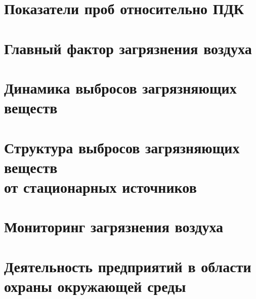 



\section{Показатели проб относительно ПДК}
\begin{frame}{\insertsectionhead}
\end{frame}

\section{Главный фактор загрязнения воздуха}
\begin{frame}{\insertsectionhead}
\end{frame}

\section{Динамика выбросов загрязняющих веществ}
\begin{frame}{\insertsectionhead}
\end{frame}

\section{Структура выбросов загрязняющих веществ \\ от
стационарных источников}
\begin{frame}{\insertsectionhead}
\end{frame}

\section{Мониторинг загрязнения воздуха}
\begin{frame}{\insertsectionhead}
\end{frame}

\section{Деятельность предприятий в области \\ охраны окружающей среды}
\begin{frame}{\insertsectionhead}
\end{frame}






